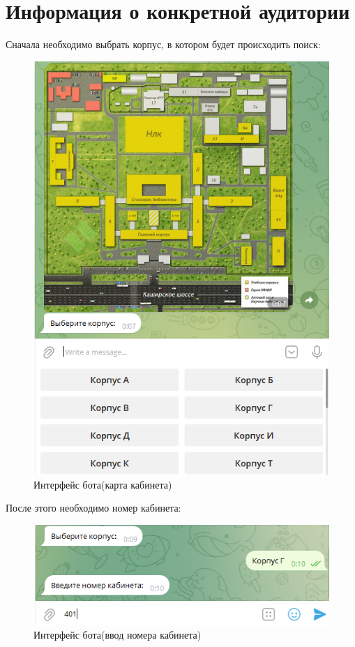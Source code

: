 \section*{Информация о конкретной аудитории}
Сначала необходимо выбрать корпус, в котором будет происходить поиск:
\begin{figure}[h]
    \centering
    \includegraphics[scale=0.8]{img/2}
    \caption{Интерфейс бота(карта кабинета)}
    \label{fig:cp}
\end{figure}

После этого необходимо номер кабинета:
\begin{figure}[h]
    \centering
    \includegraphics[scale=0.8]{img/6}
    \caption{Интерфейс бота(ввод номера кабинета)}
    \label{fig:cp}
\end{figure}


